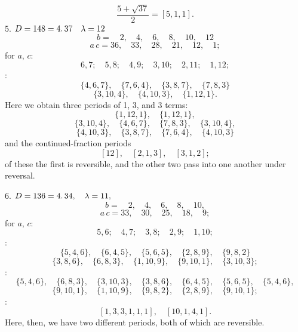 \[
\frac{5 + \sqrt{37}}{2} = [5, 1, 1].
\]
5. $D = 148 = 4 \ldotp 37 \quad \lambda = 12$
\[
b = \quad 2, \quad 4, \quad 6, \quad 8, \quad 10, \quad 12
\]
\[
a\,c = 36, \quad 33, \quad 28, \quad 21, \quad 12, \quad 1;
\]
 for $a$, $c$:
\[
6, 7; \quad 5, 8; \quad 4, 9; \quad 3, 10; \quad 2, 11; \quad 1, 12;
\]
:
\[
\{4, 6, 7\}, \quad \{7, 6, 4\}, \quad \{3, 8, 7\}, \quad \{7, 8, 3\}
\]
\[
\{3, 10, 4\}, \quad \{4, 10, 3\}, \quad \{1, 12, 1\}.
\]
Here we obtain three periods of 1, 3, and 3 terms:
\[
\{1, 12, 1\}, \quad \{1, 12, 1\},
\]
\[
\{3, 10, 4\}, \quad \{4, 6, 7\}, \quad \{7, 8, 3\}, \quad \{3, 10, 4\},
\]
\[
\{4, 10, 3\}, \quad \{3, 8, 7\}, \quad \{7, 6, 4\}, \quad \{4, 10, 3\}
\]
and the continued-fraction periods
\[
[12], \quad [2, 1, 3], \quad [3, 1, 2];
\]
of these the first is reversible, and the other two pass into one
another under reversal.

6. $D = 136 = 4 \ldotp 34, \quad \lambda = 11,$
\[
b = \quad 2, \quad 4, \quad 6, \quad 8, \quad 10,
\]
\[
a\,c = 33, \quad 30, \quad 25, \quad 18, \quad 9;
\]
 for $a$, $c$:
\[
5, 6; \quad 4, 7; \quad 3, 8; \quad 2, 9; \quad 1, 10;
\]
:
\[
\{5, 4, 6\}, \quad \{6, 4, 5\}, \quad \{5, 6, 5\}, \quad \{2, 8, 9\}, \quad \{9, 8, 2\}
\]
\[
\{3, 8, 6\}, \quad \{6, 8, 3\}, \quad \{1, 10, 9\}, \quad \{9, 10, 1\}, \quad \{3, 10, 3\};
\]
:
\[
\{5, 4, 6\}, \quad \{6, 8, 3\}, \quad \{3, 10, 3\}, \quad \{3, 8, 6\}, \quad \{6, 4, 5\}, \quad \{5, 6, 5\}, \quad \{5, 4, 6\},
\]
\[
\{9, 10, 1\}, \quad \{1, 10, 9\}, \quad \{9, 8, 2\}, \quad \{2, 8, 9\}, \quad \{9, 10, 1\};
\]
:
\[
[1, 3, 3, 1, 1, 1], \quad [10, 1, 4, 1].
\]
Here, then, we have two different periods, both of which are
reversible.
